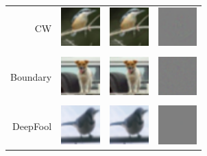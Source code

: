\documentclass{article}
\begin{document}
\begin{figure}[h]
	\centering
	\begin{tabular}{rlll} 
		CW & \includegraphics[height=1.5cm, align=c]{figures/carlini_wagner_orig.pdf} & \includegraphics[height=1.5cm, align=c]{figures/carlini_wagner_adversarial.pdf} & \includegraphics[height=1.5cm, align=c]{figures/carlini_wagner_diff.pdf}\\
		\\
		Boundary & \includegraphics[height=1.5cm, align=c]{figures/boundary_orig.pdf} & \includegraphics[height=1.5cm, align=c]{figures/boundary_adversarial.pdf} & \includegraphics[height=1.5cm, align=c]{figures/boundary_diff.pdf}\\
		\\
		DeepFool & \includegraphics[height=1.5cm, align=c]{figures/deepfool_orig.pdf} & \includegraphics[height=1.5cm, align=c]{figures/deepfool_adversarial.pdf} & \includegraphics[height=1.5cm, align=c]{figures/deepfool_diff.pdf}\\

\end{tabular}
\end{figure}
\end{document}
